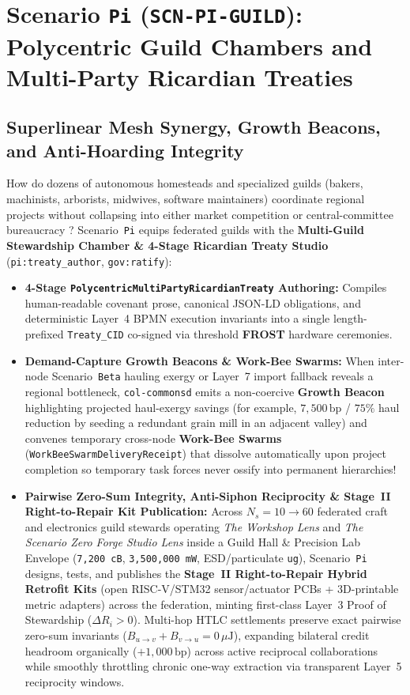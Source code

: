 \section{Scenario \texttt{Pi} (\texttt{SCN-PI-GUILD}): Polycentric Guild Chambers and Multi-Party Ricardian Treaties}
\label{sec:wave-e-pi}

\subsection{Superlinear Mesh Synergy, Growth Beacons, and Anti-Hoarding Integrity}

How do dozens of autonomous homesteads and specialized guilds (bakers, machinists, arborists, midwives, software maintainers) coordinate regional projects without collapsing into either market competition or central-committee bureaucracy \parencite{ostrom1990,beer1972}? Scenario~\texttt{Pi} equips federated guilds with the \textbf{Multi-Guild Stewardship Chamber \& 4-Stage Ricardian Treaty Studio} (\texttt{pi:treaty\_author}, \texttt{gov:ratify}):
\begin{itemize}
    \item \textbf{4-Stage \texttt{PolycentricMultiPartyRicardianTreaty} Authoring:} Compiles human-readable covenant prose, canonical JSON-LD obligations, and deterministic Layer~4 BPMN execution invariants into a single length-prefixed \texttt{Treaty\_CID} \parencite{grigg2004} co-signed via threshold \textbf{FROST} hardware ceremonies.
    \item \textbf{Demand-Capture Growth Beacons \& Work-Bee Swarms:} When inter-node Scenario~\texttt{Beta} hauling exergy or Layer~7 import fallback reveals a regional bottleneck, \texttt{col-commonsd} emits a non-coercive \textbf{Growth Beacon} highlighting projected haul-exergy savings (for example, $7{,}500\,\mathrm{bp}$ / $75\%$ haul reduction by seeding a redundant grain mill in an adjacent valley) and convenes temporary cross-node \textbf{Work-Bee Swarms} (\texttt{WorkBeeSwarmDeliveryReceipt}) that dissolve automatically upon project completion so temporary task forces never ossify into permanent hierarchies!
    \item \textbf{Pairwise Zero-Sum Integrity, Anti-Siphon Reciprocity \& Stage~II Right-to-Repair Kit Publication:} Across $N_s = 10 \to 60$ federated craft and electronics guild stewards operating \textit{The Workshop Lens} and \textit{The Scenario Zero Forge Studio Lens} inside a Guild Hall \& Precision Lab Envelope (\texttt{7,200 cB}, \texttt{3,500,000 mW}, ESD/particulate \texttt{ug}), Scenario~\texttt{Pi} designs, tests, and publishes the \textbf{Stage~II Right-to-Repair Hybrid Retrofit Kits} (open RISC-V/STM32 sensor/actuator PCBs + 3D-printable metric adapters) across the federation, minting first-class Layer~3 Proof of Stewardship ($\Delta R_i > 0$). Multi-hop HTLC settlements preserve exact pairwise zero-sum invariants ($B_{u\to v} + B_{v\to u} = 0\,\mu\mathrm{J}$), expanding bilateral credit headroom organically ($+1{,}000\,\mathrm{bp}$) across active reciprocal collaborations while smoothly throttling chronic one-way extraction via transparent Layer~5 reciprocity windows.
\end{itemize}

